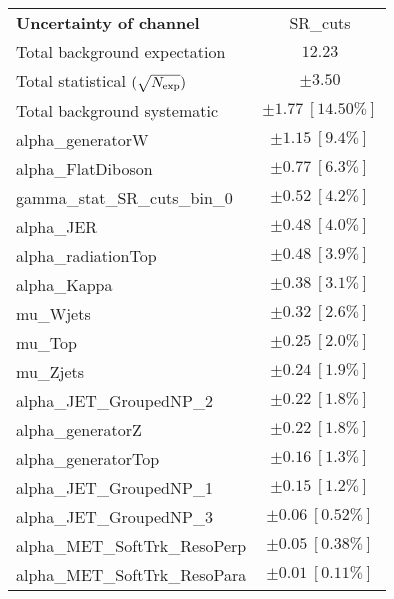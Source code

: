 
\begin{table}
\begin{center}
\setlength{\tabcolsep}{0.0pc}
\begin{tabular*}{\textwidth}{@{\extracolsep{\fill}}lc}
\noalign{\smallskip}\hline\noalign{\smallskip}
{\bf Uncertainty of channel}                                    & SR\_cuts            \\
\noalign{\smallskip}\hline\noalign{\smallskip}
Total background expectation             &  $12.23$       \\
\noalign{\smallskip}\hline\noalign{\smallskip}
Total statistical $(\sqrt{N_{\rm exp}})$              & $\pm 3.50$       \\
Total background systematic               & $\pm 1.77\ [14.50\%] $             \\
\noalign{\smallskip}\hline\noalign{\smallskip}
\noalign{\smallskip}\hline\noalign{\smallskip}
alpha\_generatorW         & $\pm 1.15\ [9.4\%] $       \\
alpha\_FlatDiboson         & $\pm 0.77\ [6.3\%] $       \\
gamma\_stat\_SR\_cuts\_bin\_0         & $\pm 0.52\ [4.2\%] $       \\
alpha\_JER         & $\pm 0.48\ [4.0\%] $       \\
alpha\_radiationTop         & $\pm 0.48\ [3.9\%] $       \\
alpha\_Kappa         & $\pm 0.38\ [3.1\%] $       \\
mu\_Wjets         & $\pm 0.32\ [2.6\%] $       \\
mu\_Top         & $\pm 0.25\ [2.0\%] $       \\
mu\_Zjets         & $\pm 0.24\ [1.9\%] $       \\
alpha\_JET\_GroupedNP\_2         & $\pm 0.22\ [1.8\%] $       \\
alpha\_generatorZ         & $\pm 0.22\ [1.8\%] $       \\
alpha\_generatorTop         & $\pm 0.16\ [1.3\%] $       \\
alpha\_JET\_GroupedNP\_1         & $\pm 0.15\ [1.2\%] $       \\
alpha\_JET\_GroupedNP\_3         & $\pm 0.06\ [0.52\%] $       \\
alpha\_MET\_SoftTrk\_ResoPerp         & $\pm 0.05\ [0.38\%] $       \\
alpha\_MET\_SoftTrk\_ResoPara         & $\pm 0.01\ [0.11\%] $       \\

\end{tabular*}
\end{center}
\end{table}
